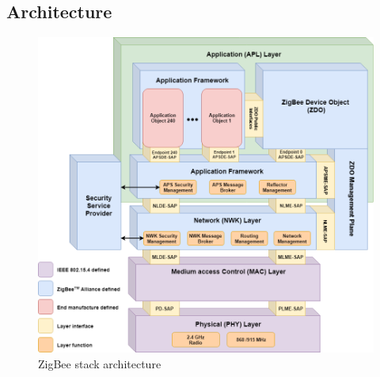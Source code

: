 \subsection{Architecture}
\begin{figure}[H]
\centering
\includegraphics[scale=0.46]{figure/ZigBeeStackArchitecture.png}
\caption{ZigBee stack architecture}
\label{fig:zigBeeArch}
\end{figure}